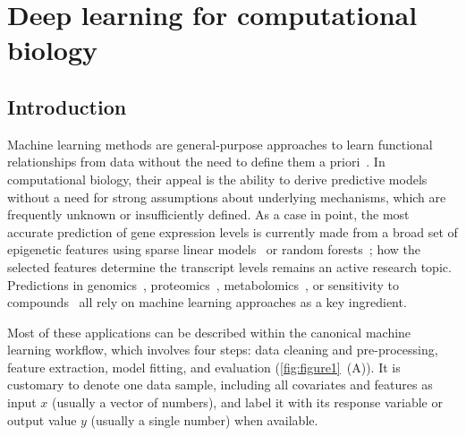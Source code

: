 
\chapter{Deep learning for computational biology}

\ifpdf
    \graphicspath{{Chapter2/Figs/Raster/}{Chapter2/Figs/PDF/}{Chapter2/Figs/}}
\else
    \graphicspath{{Chapter2/Figs/Vector/}{Chapter2/Figs/}}
\fi

\section{Introduction}
Machine learning methods are general-purpose approaches to learn functional relationships from data without the need to define them a priori~\citep{hastie_elements_2005,michalski_machine_2013,murphy_machine_2012}. In computational biology, their appeal is the ability to derive predictive models without a need for strong assumptions about underlying mechanisms, which are frequently unknown or insufficiently defined. As a case in point, the most accurate prediction of gene expression levels is currently made from a broad set of epigenetic features using sparse linear models~\citep{cheng_statistical_2011,karlic_histone_2010} or random forests~\citep{li_using_2015}; how the selected features determine the transcript levels remains an active research topic. Predictions in genomics~\citep{libbrecht_machine_2015,martens_predicting_2016}, proteomics~\citep{swan_application_2013}, metabolomics~\citep{kell_metabolomics_2005}, or sensitivity to compounds~\citep{eduati_prediction_2015} all rely on machine learning approaches as a key ingredient.

Most of these applications can be described within the canonical machine learning workflow, which involves four steps: data cleaning and pre-processing, feature extraction, model fitting, and evaluation (\autoref{fig:figure1}~(A)). It is customary to denote one data sample, including all covariates and features as input $x$ (usually a vector of numbers), and label it with its response variable or output value $y$ (usually a single number) when available.

